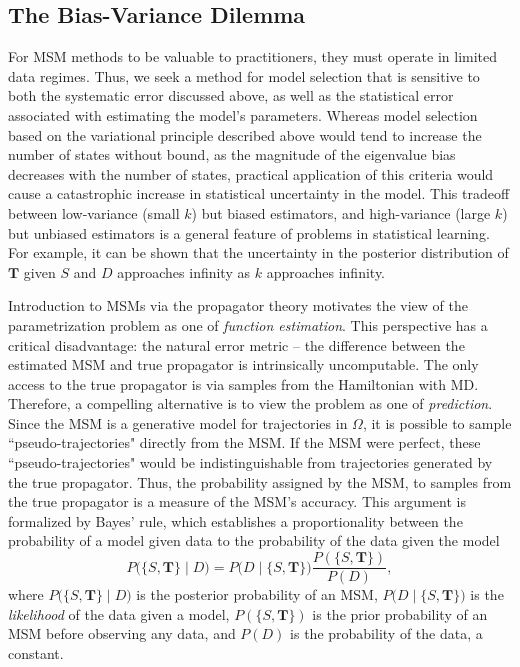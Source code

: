 \documentclass[journal=jpcbfk, layout=traditional, manuscript=article]{achemso}
\begin{document}
\subsection{The Bias-Variance Dilemma}
For MSM methods to be valuable to practitioners, they must operate in limited data regimes. Thus, we seek a method for model selection that is sensitive to both the systematic error discussed above, as well as the statistical error associated with estimating the model's parameters. Whereas model selection based on the variational principle described above would tend to increase the number of states without bound, as the magnitude of the eigenvalue bias decreases with the number of states, practical application of this criteria would cause a catastrophic increase in statistical uncertainty in the model. This tradeoff between low-variance (small $k$) but biased estimators, and high-variance (large $k$) but unbiased estimators is a general feature of problems in statistical learning\cite{Sammut2010Encyclopedia}. For example, it can be shown that the uncertainty in the posterior distribution of $\mathbf{T}$ given $S$ and $D$ approaches infinity as $k$ approaches infinity.

Introduction to MSMs via the propagator theory motivates the view of the parametrization problem as one of \emph{function estimation}. This perspective has a critical disadvantage: the natural error metric -- the difference between the estimated MSM and true propagator is intrinsically uncomputable. The only access to the true propagator is via samples from the Hamiltonian with MD. Therefore, a compelling alternative is to view the problem as one of \emph{prediction}. Since the MSM is a generative model for trajectories in $\Omega$, it is possible to sample ``pseudo-trajectories" directly from the MSM. If the MSM were perfect, these ``pseudo-trajectories" would be indistinguishable from trajectories generated by the true propagator. Thus, the probability assigned by the MSM, to samples from the true propagator is a measure of the MSM's accuracy. This argument is formalized by Bayes' rule, which establishes a proportionality between the probability of a model given data to the probability of the data given the model
\begin{equation}
\label{eq:bayes}
P\Big(\{S, \mathbf{T}\} \;\Big|\; D\Big) = P\Big(D \;\Big|\; \{S, \mathbf{T}\}\Big) \frac{P(\{S, \mathbf{T}\})}{P(D)},
\end{equation}
where $P\Big(\{S, \mathbf{T}\} \;\Big|\; D\Big)$ is the posterior probability of an MSM, $P\Big(D \;\Big|\; \{S, \mathbf{T}\}\Big)$ is the \emph{likelihood} of the data given a model, $P(\{S, \mathbf{T}\})$ is the prior probability of an MSM before observing any data, and $P(D)$ is the probability of the data, a constant.
\end{document}
